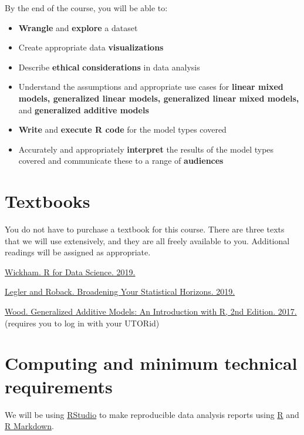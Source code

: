 \documentclass[
  openany]{book}
\begin{document}
By the end of the course, you will be able to:

\begin{itemize}
\item
  \textbf{Wrangle} and \textbf{explore} a dataset
\item
  Create appropriate data \textbf{visualizations}
\item
  Describe \textbf{ethical} \textbf{considerations} in data analysis
\item
  Understand the assumptions and appropriate use cases for \textbf{linear mixed models, generalized linear models, generalized linear mixed models,} and \textbf{generalized additive models}
\item
  \textbf{Write} and \textbf{execute R code} for the model types covered
\item
  Accurately and appropriately \textbf{interpret} the results of the model types covered and communicate these to a range of \textbf{audiences}
\end{itemize}

\hypertarget{textbooks}{%
\section{Textbooks}\label{textbooks}}

You do not have to purchase a textbook for this course. There are three texts that we will use extensively, and they are all freely available to you. Additional readings will be assigned as appropriate.

\href{https://r4ds.had.co.nz}{Wickham. R for Data Science. 2019.}

\href{https://bookdown.org/roback/bookdown-bysh/}{Legler and Roback. Broadening Your Statistical Horizons. 2019.}

\href{https://ebookcentral-proquest-com.myaccess.library.utoronto.ca/lib/utoronto/detail.action?docID=4862399}{Wood. Generalized Additive Models: An Introduction with R, 2nd Edition. 2017.} (requires you to log in with your UTORid)

\hypertarget{computing-and-minimum-technical-requirements}{%
\section{Computing and minimum technical requirements}\label{computing-and-minimum-technical-requirements}}

We will be using \href{https://www.rstudio.com/}{RStudio} to make reproducible data analysis reports using \href{https://www.r-project.org/}{R} and \href{http://rmarkdown.rstudio.com/}{R Markdown}.
\end{document}
